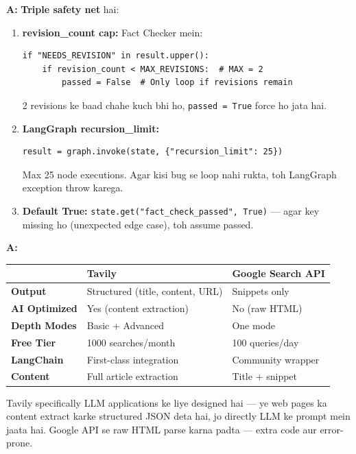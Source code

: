 \documentclass[12pt, a4paper]{article}
\begin{document}
\begin{interviewbox}[title={\faIcon{user-tie} ~Q5: Feedback loop mein infinite recursion kaise prevent kiya?}]
\textbf{A:} \textbf{Triple safety net} hai:

\begin{enumerate}
\item \textbf{revision\_count cap:} Fact Checker mein:
\begin{lstlisting}[style=pythonstyle]
if "NEEDS_REVISION" in result.upper():
    if revision_count < MAX_REVISIONS:  # MAX = 2
        passed = False  # Only loop if revisions remain
\end{lstlisting}
2 revisions ke baad chahe kuch bhi ho, \texttt{passed = True} force ho jata hai.

\item \textbf{LangGraph recursion\_limit:}
\begin{lstlisting}[style=pythonstyle]
result = graph.invoke(state, {"recursion_limit": 25})
\end{lstlisting}
Max 25 node executions. Agar kisi bug se loop nahi rukta, toh LangGraph exception throw karega.

\item \textbf{Default True:} \texttt{state.get("fact\_check\_passed", True)} --- agar key missing ho (unexpected edge case), toh assume passed.
\end{enumerate}
\end{interviewbox}

\begin{interviewbox}[title={\faIcon{user-tie} ~Q6: Tavily vs Google Search API --- kyun Tavily choose kiya?}]
\textbf{A:}
\begin{center}
\small
\begin{tabular}{|l|p{5cm}|p{5cm}|}
\hline
\rowcolor{accentpurple!15}
& \textbf{Tavily} & \textbf{Google Search API} \\
\hline
\textbf{Output} & Structured (title, content, URL) & Snippets only \\
\hline
\textbf{AI Optimized} & Yes (content extraction) & No (raw HTML) \\
\hline
\textbf{Depth Modes} & Basic + Advanced & One mode \\
\hline
\textbf{Free Tier} & 1000 searches/month & 100 queries/day \\
\hline
\textbf{LangChain} & First-class integration & Community wrapper \\
\hline
\textbf{Content} & Full article extraction & Title + snippet \\
\hline
\end{tabular}
\end{center}

Tavily specifically LLM applications ke liye designed hai --- ye web pages ka content extract karke structured JSON deta hai, jo directly LLM ke prompt mein jaata hai. Google API se raw HTML parse karna padta --- extra code aur error-prone.
\end{interviewbox}
\end{document}
